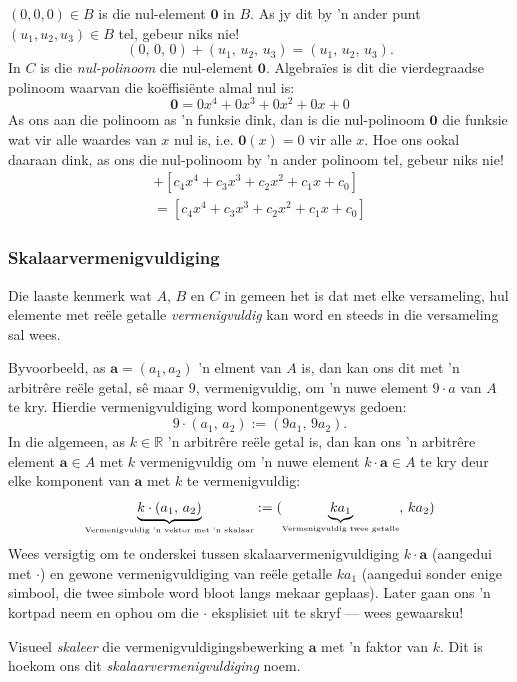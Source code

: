 \documentclass[a4paper,11pt]{book}
\theoremstyle{definition}
\newcommand{\be}{\begin{equation}}
\newcommand{\ee}{\end{equation}}
\newcommand{\ve}[1]{\mathbf{#1}}
\begin{document}
$(0,0,0) \in B$ is die nul-element $\ve{0}$ in $B$. As jy dit by 'n ander
punt $(u_1, u_2, u_3) \in B$ tel, gebeur niks nie!
\[
	(0, \, 0, \, 0) + (u_1, \, u_2, \, u_3) = (u_1, \, u_2, \, u_3).
\]
In $C$ is die \emph{nul-polinoom} die nul-element $\ve{0}$. Algebra{\"i}es
is dit die vierdegraadse polinoom waarvan die ko{\"e}ffisi{\"e}nte almal
nul is:
\be \label{zero_in_C}
\ve{0} = 0 x^4 + 0 x^3 + 0 x^2 + 0 x + 0
\ee
As ons aan die polinoom as 'n funksie dink, dan is die nul-polinoom
$\ve{0}$ die funksie wat vir alle waardes van $x$ nul is, i.e. $\ve{0} (x)
= 0$ vir alle $x$. Hoe ons ookal daaraan dink, as ons die nul-polinoom by
'n ander polinoom tel, gebeur niks nie!
\begin{multline*}
	[0 x^4 + 0 x^3 + 0 x^2 + 0 x + 0 ] + [c_4 x^4 + c_3 x^3 + c_2 x^2 + c_1
	x + c_0] \\
	= [c_4 x^4 + c_3 x^3 + c_2 x^2 + c_1 x + c_0]
\end{multline*}

\subsubsection{Skalaarvermenigvuldiging}
Die laaste kenmerk wat $A$, $B$ en $C$ in gemeen het is dat met elke
versameling, hul elemente met re{\"e}le getalle \emph{vermenigvuldig} kan
word en steeds in die versameling sal wees.

Byvoorbeeld, as $\ve{a} = (a_1, a_2)$ 'n elment van $A$ is, dan kan ons dit
met 'n arbitr{\^e}re re{\"e}le getal, s{\^e} maar $9$, vermenigvuldig, om
'n nuwe element $9\cdot a$ van $A$ te kry. Hierdie vermenigvuldiging word
komponentgewys gedoen:
\be \label{sm_in_A}
9 \cdot (a_1, \,a_2) := (9 a_1, \, 9a_2).
\ee
In die algemeen, as $k \in \mathbb{R}$ 'n arbitr{\^e}re re{\"e}le getal is,
dan kan ons 'n arbitr{\^e}re element $\ve{a} \in A$ met $k$ vermenigvuldig
om 'n nuwe element $k \cdot \ve{a} \in A$ te kry deur elke komponent van
$\ve{a}$ met $k$ te vermenigvuldig:
\[
	\underbrace{k \cdot (a_1, \, a_2)}_{\mbox{\tiny Vermenigvuldig 'n
	vektor met 'n skalaar}} := (\underbrace{k a_1}_{\mbox{\tiny
	Vermenigvuldig twee getalle}}, \, k a_2)
\]
Wees versigtig om te onderskei tussen skalaarvermenigvuldiging $k \cdot
\ve{a}$ (aangedui met $\cdot$) en gewone vermenigvuldiging van re{\"e}le
getalle $k a_1$ (aangedui sonder enige simbool, die twee simbole word bloot
langs mekaar geplaas). Later gaan ons 'n kortpad neem en ophou om die
$\cdot$ eksplisiet uit te skryf --- wees gewaarsku!

Visueel \emph{skaleer} die vermenigvuldigingsbewerking $\ve{a}$ met 'n
faktor van $k$.  Dit is hoekom ons dit \emph{skalaarvermenigvuldiging}
noem.
\end{document}
